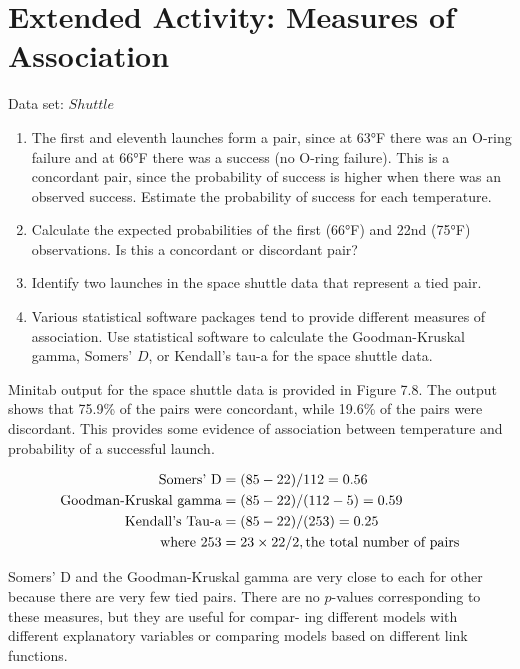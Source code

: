 \documentclass[
]{report}
\providecommand{\tightlist}{%
  \setlength{\itemsep}{0pt}\setlength{\parskip}{0pt}}
\begin{document}
\section*{Extended Activity: Measures of Association}\label{extended-activity-measures-of-association}

Data set: \(Shuttle\)

\begin{enumerate}
\def\labelenumi{\arabic{enumi}.}
\setcounter{enumi}{18}
\tightlist
\item
  The first and eleventh launches form a pair, since at 63°F there was an O-ring failure and at 66°F there was a success (no O-ring failure). This is a concordant pair, since the probability of success is higher when there was an observed success. Estimate the probability of success for each temperature.
\item
  Calculate the expected probabilities of the first (66°F) and 22nd (75°F) observations. Is this a concordant or discordant pair?
\item
  Identify two launches in the space shuttle data that represent a tied pair.
\item
  Various statistical software packages tend to provide different measures of association. Use statistical software to calculate the Goodman-Kruskal gamma, Somers' \(D\), or Kendall's tau-a for the space shuttle data.
\end{enumerate}

Minitab output for the space shuttle data is provided in Figure 7.8. The output shows that 75.9\% of the pairs
were concordant, while 19.6\% of the pairs were discordant. This provides some evidence of association
between temperature and probability of a successful launch.

\begin{align}
\text{Somers’ D} &= (85 - 22)/112 = 0.56 \notag \\
\text{Goodman-Kruskal gamma} &= (85 - 22)/(112 - 5) = 0.59 \notag \\
\text{Kendall’s Tau-a} &= (85 - 22)/(253) = 0.25 \notag \\
\text{where } 253 &= 23 \times 22/2, \text{the total number of pairs} \notag
\end{align}

Somers' D and the Goodman-Kruskal gamma are very close to each for other because there are very
few tied pairs. There are no \(p\)-values corresponding to these measures, but they are useful for compar-
ing different models with different explanatory variables or comparing models based on different link
functions.
\end{document}
